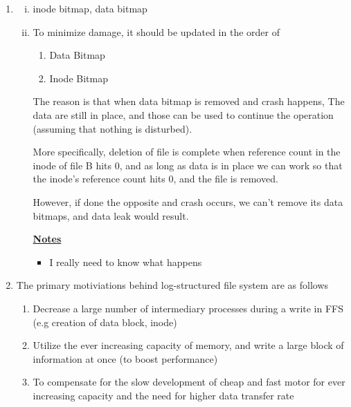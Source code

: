 \documentclass[12pt]{article}
\begin{document}
\begin{enumerate}[1.]
\begin{enumerate}[1)]
        \item

        \begin{enumerate}[i)]
            \item inode bitmap, data bitmap
            \item

            To minimize damage, it should be updated in the order of

            \bigskip

            \begin{enumerate}[1.]
                \item Data Bitmap
                \item Inode Bitmap
            \end{enumerate}

            \bigskip

            The reason is that when data bitmap is removed and crash happens,
            The data are still in place, and those can be used to continue the operation
            (assuming that nothing is disturbed).

            \bigskip

            More specifically, deletion of file is complete when reference count in the inode of
            file B hits 0, and as long as data is in place we can work so that the inode's
            reference count hits 0, and the file is removed.

            \bigskip

            However, if done the opposite and crash occurs, we can't remove its data bitmaps,
            and data leak would result.

            \bigskip

            \underline{\textbf{Notes}}

            \begin{itemize}
                \item I really need to know what happens
            \end{itemize}
        \end{enumerate}

        \item

        The primary motiviations behind log-structured file system are as follows

        \begin{enumerate}[1.]
            \item Decrease a large number of intermediary processes during a write in FFS (e.g creation of data block, inode)
            \item Utilize the ever increasing capacity of memory, and write a large block of information at once (to boost performance)
            \item To compensate for the slow development of cheap and fast motor for ever increasing capacity and the need for higher data transfer rate
        \end{enumerate}


\end{enumerate}
\end{enumerate}
\end{document}
